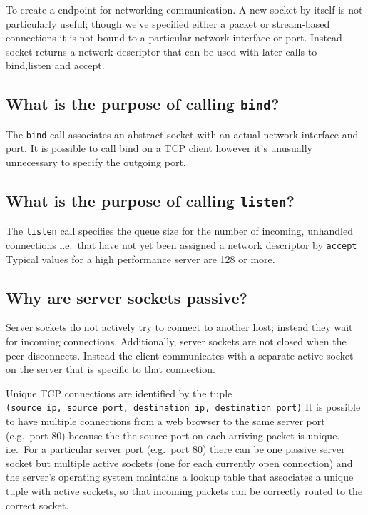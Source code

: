 To create a endpoint for networking communication. A new socket by
itself is not particularly useful; though we've specified either a
packet or stream-based connections it is not bound to a particular
network interface or port. Instead socket returns a network descriptor
that can be used with later calls to bind,listen and accept.

\subsection{\texorpdfstring{What is the purpose of calling
\texttt{bind}?}{What is the purpose of calling bind?}}\label{what-is-the-purpose-of-calling-bind}

The \texttt{bind} call associates an abstract socket with an actual
network interface and port. It is possible to call bind on a TCP client
however it's unusually unnecessary to specify the outgoing port.

\subsection{\texorpdfstring{What is the purpose of calling
\texttt{listen}?}{What is the purpose of calling listen?}}\label{what-is-the-purpose-of-calling-listen}

The \texttt{listen} call specifies the queue size for the number of
incoming, unhandled connections i.e.~that have not yet been assigned a
network descriptor by \texttt{accept} Typical values for a high
performance server are 128 or more.

\subsection{Why are server sockets
passive?}\label{why-are-server-sockets-passive}

Server sockets do not actively try to connect to another host; instead
they wait for incoming connections. Additionally, server sockets are not
closed when the peer disconnects. Instead the client communicates with a
separate active socket on the server that is specific to that
connection.

Unique TCP connections are identified by the tuple
\texttt{(source\ ip,\ source\ port,\ destination\ ip,\ destination\ port)}
It is possible to have multiple connections from a web browser to the
same server port (e.g.~port 80) because the the source port on each
arriving packet is unique. i.e.~For a particular server port (e.g.~port
80) there can be one passive server socket but multiple active sockets
(one for each currently open connection) and the server's operating
system maintains a lookup table that associates a unique tuple with
active sockets, so that incoming packets can be correctly routed to the
correct socket.

